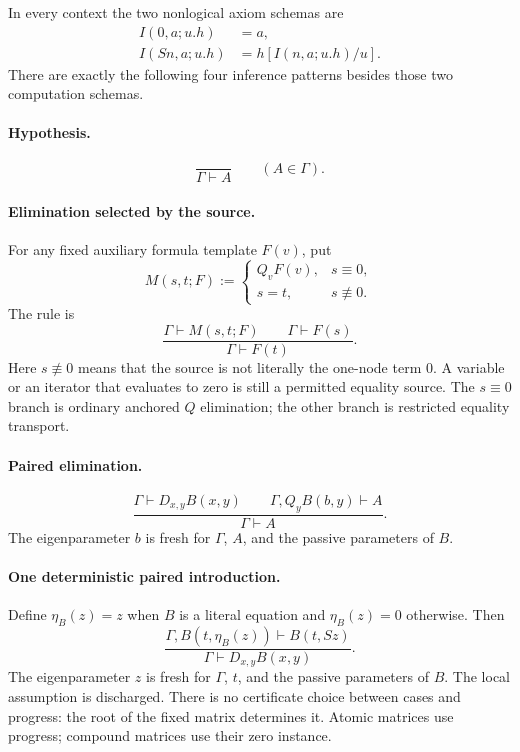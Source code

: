 \documentclass[11pt,letterpaper]{article}
\theoremstyle{definition}
\newcommand{\synneq}{\not\equiv}
\begin{document}
In every context the two nonlogical axiom schemas are
\begin{align}
 I(0,a;u.h)&=a, \tag{I0}\label{eq:i0}\\
 I(Sn,a;u.h)&=h[I(n,a;u.h)/u]. \tag{IS}\label{eq:is}
\end{align}
There are exactly the following four inference patterns besides those two
computation schemas.

\paragraph{Hypothesis.}
\[
 \frac{}{\Gamma\vdash A}\qquad(A\in\Gamma).
 \tag{Hyp}
\]

\paragraph{Elimination selected by the source.}
For any fixed auxiliary formula template $F(v)$, put
\[
 M(s,t;F):=
 \begin{cases}
 Q_vF(v),&s\equiv0,\\
 s=t,&s\synneq0.
 \end{cases}
\]
The rule is
\[
 \frac{\Gamma\vdash M(s,t;F)\qquad\Gamma\vdash F(s)}
      {\Gamma\vdash F(t)}.
 \tag{SE}\label{eq:se}
\]
Here $s\synneq0$ means that the source is not literally the one-node term
$0$. A variable or an iterator that evaluates to zero is still a permitted
equality source. The $s\equiv0$ branch is ordinary anchored $Q$ elimination;
the other branch is restricted equality transport.

\paragraph{Paired elimination.}
\[
 \frac{\Gamma\vdash D_{x,y}B(x,y)\qquad
       \Gamma,Q_yB(b,y)\vdash A}
      {\Gamma\vdash A}.
 \tag{DE}\label{eq:de}
\]
The eigenparameter $b$ is fresh for $\Gamma$, $A$, and the passive
parameters of $B$.

\paragraph{One deterministic paired introduction.}
Define $\eta_B(z)=z$ when $B$ is a literal equation and $\eta_B(z)=0$
otherwise. Then
\[
 \frac{\Gamma,B(t,\eta_B(z))\vdash B(t,Sz)}
      {\Gamma\vdash D_{x,y}B(x,y)}.
 \tag{DI}\label{eq:di}
\]
The eigenparameter $z$ is fresh for $\Gamma$, $t$, and the passive
parameters of $B$. The local assumption is discharged. There is no
certificate choice between cases and progress: the root of the fixed
matrix determines it. Atomic matrices use progress; compound matrices use
their zero instance.
\end{document}
